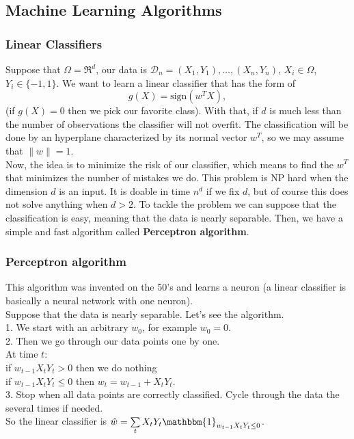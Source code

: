 \documentclass[11pt, english]{article}
\newcommand{\su}[2]{\sum\limits_{#1}^{#2}}
\begin{document}
\subsection{Machine Learning Algorithms}

\subsubsection{Linear Classifiers}

Suppose that $\Omega= \Re^d$, our data is $\mathcal{D}_n=(X_1,Y_1),\dots,(X_n,Y_n)$, $X_i\in \Omega$, $Y_i\in\{-1,1\}$. We want to learn a linear classifier that has the form of 
\begin{equation}
	g(X)=\text{sign}(w^TX),
\end{equation}
(if $g(X)=0$ then we pick our favorite class). With that, if $d$ is much less than the number of observations the classifier will not overfit. The classification will be done by an hyperplane characterized by its normal vector $w^T$, so we may assume that $\|w\|=1$.\\

Now, the idea is to minimize the risk of our classifier, which means to find the $w^T$ that minimizes the number of mistakes we do. This problem is NP hard when the dimension $d$ is an input. It is doable in time $n^d$ if we fix $d$, but of course this does not solve anything when $d>2$. To tackle the problem we can suppose that the classification is easy, meaning that the data is nearly separable. Then, we have a simple and fast algorithm called \textbf{Perceptron algorithm}.

\subsubsection{Perceptron algorithm}
This algorithm was invented on the 50's and learns a neuron (a linear classifier is basically a neural network with one neuron). \\
Suppose that the data is nearly separable. Let's see the algorithm.\\

1. We start with an arbitrary $w_0$, for example $w_0=0$.\\
2. Then we go through our data points one by one.\\
At time $t$:\\
\indent if $w_{t-1}X_tY_t> 0$ then we do nothing\\
\hspace{2cm} if $w_{t-1}X_tY_t\leq 0$ then $w_t=w_{t-1}+X_tY_t$.\\
3. Stop when all data points are correctly classified. Cycle through the data the several times if needed. \\
So the linear classifier is $\hat{w}=\su{t}{}X_tY_t\mathbbm{1}_{w_{t-1}X_tY_t\leq 0}$.\\
\end{document}

